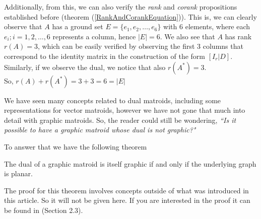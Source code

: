 \begin{exmp}
    Additionally, from this, we can also verify the \textit{rank} and \textit{corank} propositions established before (theorem (\ref{RankAndCorankEquation})). This is, we can clearly observe that $A$ has a ground set $E=\{e_1, e_2, \dots, e_6\}$ with 6 elements, where each $e_i; i =1,2, \dots,6$ represents a column, hence $|E|=6$. We also see that $A$ has rank $r(A)=3$, which can be easily verified by observing the first 3 columns that correspond to the identity matrix in the construction of the form $[I_r|D]$. Similarly, if we observe the dual, we notice that also $r(A^*)=3$. \\So, $r(A)+r(A^*)= 3 + 3 = 6 = |E|$
\end{exmp}

%

We have seen many concepts related to dual matroids, including some representations for vector matroids, however we have not gone that much into detail with graphic matroids. So, the reader could still be wondering, \textit{``Is it possible to have a graphic matroid whose dual is not graphic?"}

To answer that we have the following theorem

\begin{theorem}
    The dual of a graphic matroid is itself graphic if and only if the underlying graph is planar.
\end{theorem}
The proof for this theorem involves concepts outside of what was introduced in this article. So it will not be given here. If you are interested in the proof it can be found in \cite{oxley1} (Section 2.3).

